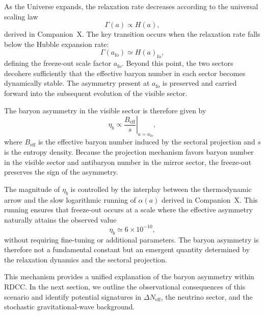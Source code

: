\documentclass[11pt,a4paper]{article}
\newcommand{\Ha}{H(a)}
\newcommand{\GammaR}{\Gamma}
\newcommand{\alphaR}{\alpha}
\begin{document}
As the Universe expands, the relaxation rate decreases according to the
universal scaling law
\begin{equation}
\GammaR(a) \propto \Ha,
\end{equation}
derived in Companion~X. The key transition occurs when the relaxation rate
falls below the Hubble expansion rate:
\begin{equation}
\GammaR(a_{\mathrm{fo}}) \simeq \Ha_{\mathrm{fo}},
\end{equation}
defining the freeze-out scale factor $a_{\mathrm{fo}}$. Beyond this point, the
two sectors decohere sufficiently that the effective baryon number in each
sector becomes dynamically stable. The asymmetry present at $a_{\mathrm{fo}}$ is
preserved and carried forward into the subsequent evolution of the visible
sector.

The baryon asymmetry in the visible sector is therefore given by
\begin{equation}
\eta_b \propto
\left.
\frac{B_{\mathrm{eff}}}{s}
\right|_{a = a_{\mathrm{fo}}},
\end{equation}
where $B_{\mathrm{eff}}$ is the effective baryon number induced by the sectoral
projection and $s$ is the entropy density. Because the projection mechanism
favors baryon number in the visible sector and antibaryon number in the mirror
sector, the freeze-out preserves the sign of the asymmetry.

The magnitude of $\eta_b$ is controlled by the interplay between the
thermodynamic arrow and the slow logarithmic running of $\alphaR(a)$ derived in
Companion~X. This running ensures that freeze-out occurs at a scale where the
effective asymmetry naturally attains the observed value
\begin{equation}
\eta_b \simeq 6 \times 10^{-10},
\end{equation}
without requiring fine-tuning or additional parameters. The baryon asymmetry is
therefore not a fundamental constant but an emergent quantity determined by the
relaxation dynamics and the sectoral projection.

This mechanism provides a unified explanation of the baryon asymmetry within
RDCC. In the next section, we outline the observational consequences of this
scenario and identify potential signatures in $\Delta N_{\mathrm{eff}}$, the
neutrino sector, and the stochastic gravitational-wave background.



\end{document}
